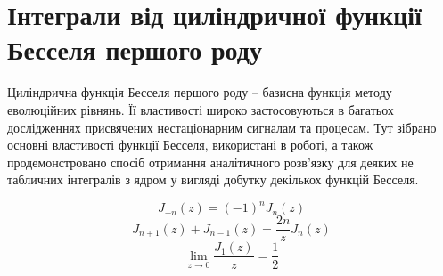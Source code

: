 \chapter{Інтеграли від циліндричної функції Бесселя першого роду}
\label{ch:bessel}

Циліндрична функція Бесселя першого роду -- базисна функція методу еволюційних 
рівнянь. Її властивості широко застосовуються в багатьох дослідженнях присвячених
нестаціонарним сигналам та процесам. Тут зібрано основні властивості 
функції Бесселя, використані в роботі, а також продемонстровано спосіб отримання 
аналітичного розв'язку для деяких не табличних інтегралів з
ядром у вигляді добутку декількох функцій Бесселя.

\begin{equation}
J_{-n} \left( z \right) = \left( -1 \right)^n J_n \left( z \right)
\end{equation}
%
\begin{equation} \label{eq:bessel_order_change}
J_{n+1} \left( z \right) + J_{n-1} \left( z \right) = 
\frac{2n}{z} J_n \left( z \right)
\end{equation}
\begin{equation} \label{eq:limJ1toZ}
\lim_{z \to 0} \left. \frac{J_1 \left( z \right)}{z} \right. = \frac{1}{2}
\end{equation}

